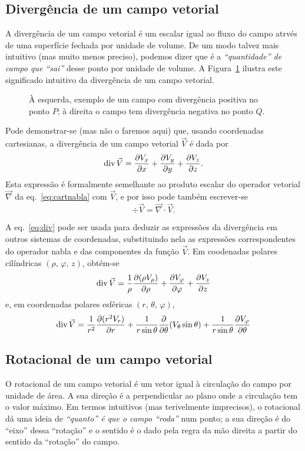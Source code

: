 \subsection*{Divergência de um campo vetorial}
A divergência de um campo vetorial é um escalar igual ao fluxo do campo atrvés
de uma superfície fechada por unidade de volume.  De um modo talvez mais
intuitivo (mas muito menos preciso), podemos dizer que é a \emph{``quantidade''
de campo que ``sai''} desse ponto por unidade de volume. A
Figura~\ref{fig:10-020} ilustra este significado intuitivo da divergência de um
campo vetorial.
\begin{figure}[htb]
  {\centering
    \par
  }
  \caption{À esquerda, exemplo de um campo com divergência positiva no ponto
  $P$; à direita o campo tem divergência negativa no ponto
  $Q$.\label{fig:10-020}}
\end{figure}


Pode demonstrar-se (mas não o faremos aqui) que, usando coordenadas cartesianas,
a divergência de um campo vetorial $\vec V$ é dada por
\begin{equation}\label{eq:divcart}
  \div\vec V=\pd{V_x}{x} + \pd{V_y}{y}+\pd{V_z}{z}.
\end{equation}
Esta expressão é formalmente semelhante ao produto escalar do operador vetorial
$\vec\nabla$ da eq.~\eqref{eq:cartnabla} com $\vec V$, e por isso pode também
escrever-se
\begin{equation}\label{eq:div}
  \div\vec V=\vec\nabla\cdot\vec V.
\end{equation}

A eq.~\eqref{eq:div} pode ser usada para deduzir as expressões da divergência em
outros sistemas de coordenadas, substituindo nela as expressões correspondentes
do operador nabla e das componentes da função $\vec V$. Em coodenadas polares
cilíndricas $(\rho,\,\varphi,\,z)$, obtém-se
\begin{equation}
\div\vec V=\frac{1}{\rho}\pd{(\rho V_\rho)}{\rho}
    +\pd{V_\varphi}{\varphi}+\pd{V_z}{z}
\end{equation}
e, em coordenadas polares esféricas $(r,\,\theta,\,\varphi)$, 
\begin{equation}
\div \vec V=\frac{1}{r^2}\pd{(r^2V_r)}{r}+
    \frac{1}{r\sin\theta}\pd{}{\theta}(V_\theta\sin\theta)+
    \frac{1}{r\sin\theta}\pd{V_\varphi}{\theta}
\end{equation}

\subsection*{Rotacional de um campo vetorial}
O rotacional de um campo vetorial é um vetor igual à circulação do campo por
unidade de área. A sua direção é a perpendicular ao plano onde a circulação tem
o valor máximo. Em termos intuitivos (mas terivelmente imprecisos), o rotacional
dá uma ideia de \emph{``quanto'' é que o campo ``roda''} num ponto; a sua
direção é do ``eixo'' dessa ``rotação'' e o sentido é o dado pela regra da mão
direita a partir do sentido da ``rotação'' do campo. 

